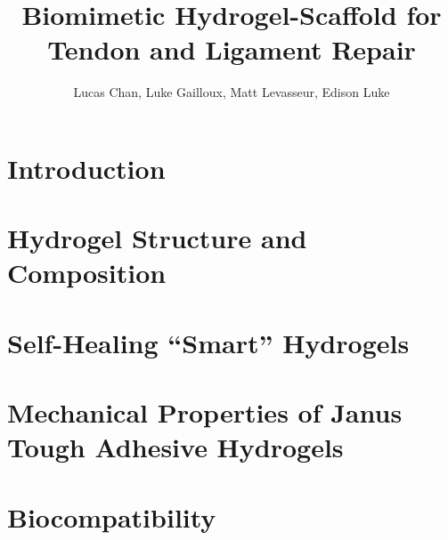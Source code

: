 \documentclass[
    letterpaper,
    10pt,
    unnumberedsections,
    twoside
]{LTJournalArticle}
\title{Biomimetic Hydrogel-Scaffold for Tendon and Ligament Repair}
\author{Lucas Chan, Luke Gailloux, Matt Levasseur, Edison Luke}
\begin{document}
    \maketitle 

    \section{Introduction}

    

    \section{Hydrogel Structure and Composition}

    

    \section{Self-Healing ``Smart'' Hydrogels}
    

    \section{Mechanical Properties of Janus Tough Adhesive Hydrogels}

    

    \section{Biocompatibility}

    
\end{document}
